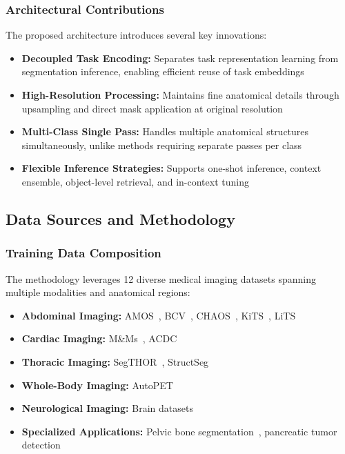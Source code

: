\subsubsection{Architectural Contributions}
The proposed architecture introduces several key innovations:
\begin{itemize}
    \item \textbf{Decoupled Task Encoding:} Separates task representation learning from segmentation inference, enabling efficient reuse of task embeddings
    \item \textbf{High-Resolution Processing:} Maintains fine anatomical details through upsampling and direct mask application at original resolution
    \item \textbf{Multi-Class Single Pass:} Handles multiple anatomical structures simultaneously, unlike methods requiring separate passes per class
    \item \textbf{Flexible Inference Strategies:} Supports one-shot inference, context ensemble, object-level retrieval, and in-context tuning
\end{itemize}

\subsection{Data Sources and Methodology}
\subsubsection{Training Data Composition}
The methodology leverages 12 diverse medical imaging datasets spanning multiple modalities and anatomical regions:
\begin{itemize}
    \item \textbf{Abdominal Imaging:} AMOS~\cite{ji2022amos}, BCV~\cite{bcv}, CHAOS~\cite{CHAOS2021}, KiTS~\cite{heller2019kits19}, LiTS~\cite{bilic2019liver}
    \item \textbf{Cardiac Imaging:} M\&Ms~\cite{campello2021multi}, ACDC~\cite{bernard2018deep}
    \item \textbf{Thoracic Imaging:} SegTHOR~\cite{lambert2020segthor}, StructSeg~\cite{structseg}
    \item \textbf{Whole-Body Imaging:} AutoPET~\cite{gatidis2022whole}
    \item \textbf{Neurological Imaging:} Brain datasets~\cite{rodrigue2012beta}
    \item \textbf{Specialized Applications:} Pelvic bone segmentation~\cite{liu2021deep}, pancreatic tumor detection~\cite{antonelli2022medical}
\end{itemize}

